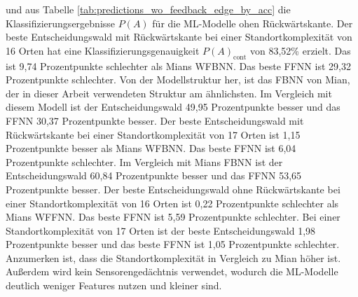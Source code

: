 und aus Tabelle \ref{tab:predictions_wo_feedback_edge_by_acc} die Klassifizierungsergebnisse $P(A)$ für die ML-Modelle ohen Rückwärtskante.
Der beste Entscheidungswald mit Rückwärtskante bei einer Standortkomplexität von 16 Orten hat eine Klassifizierungsgenauigkeit $P(A)_{\text{cont}}$ von 83,52\% erzielt.
Das ist 9,74 Prozentpunkte schlechter als Mians WFBNN.
Das beste FFNN ist 29,32 Prozentpunkte schlechter.
Von der Modellstruktur her, ist das FBNN von Mian, der in dieser Arbeit verwendeten Struktur am ähnlichsten.
Im Vergleich mit diesem Modell ist der Entscheidungswald 49,95 Prozentpunkte besser und das FFNN 30,37 Prozentpunkte besser.
\newline
\newline
Der beste Entscheidungswald mit Rückwärtskante bei einer Standortkomplexität von 17 Orten ist 1,15 Prozentpunkte besser als Mians WFBNN.
Das beste FFNN ist 6,04 Prozentpunkte schlechter.
Im Vergleich mit Mians FBNN ist der Entscheidungswald 60,84 Prozentpunkte besser und das FFNN 53,65 Prozentpunkte besser.
\newline
\newline
Der beste Entscheidungswald ohne Rückwärtskante bei einer Standortkomplexität von 16 Orten ist 0,22 Prozentpunkte schlechter als Mians WFFNN.
Das beste FFNN ist 5,59 Prozentpunkte schlechter.
Bei einer Standortkomplexität von 17 Orten ist der beste Entscheidungswald 1,98 Prozentpunkte besser und das beste FFNN ist 1,05 Prozentpunkte schlechter.
Anzumerken ist, dass die Standortkomplexität in Vergleich zu Mian höher ist.
Außerdem wird kein Sensorengedächtnis verwendet, wodurch die ML-Modelle deutlich weniger Features nutzen und kleiner sind.

